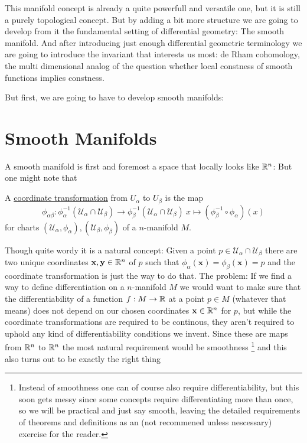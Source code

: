 This manifold concept is already a quite powerfull and versatile one, but it is still a purely topological
concept. But by adding a bit more structure we are going to develop from it the fundamental setting of differential geometry:
The smooth manifold. And after introducing just enough differential geometric terminology we are going
to introduce the invariant that interests us most: de Rham cohomology, the multi dimensional analog of
the question whether local constness of smooth functions implies constness.

But first, we are going to have to develop smooth manifolds:

\section{Smooth Manifolds}
A smooth manifold is first and foremost a space that locally looks like $\mathbb{R}^n$:
But one might note that 
\begin{definition}
A \underline{coordinate transformation} from $U_\alpha$ to $U_\beta$ is the map
\[
	\phi_{\alpha \beta}: 
		\phi^{-1}_\alpha(\mathcal{U}_\alpha \cap \mathcal{U}_\beta)
		\to
		\phi^{-1}_\beta(\mathcal{U}_\alpha \cap \mathcal{U}_\beta) \
		x \mapsto (\phi^{-1}_\beta \circ \phi_\alpha)(x)
\]
for charts $(\mathcal{U}_\alpha, \phi_\alpha), (\mathcal{U}_\beta, \phi_\beta)$
of a $n$-manifold $M$.
\end{definition}
Though quite wordy it is a natural concept: Given a point
$p \in \mathcal{U}_\alpha \cap \mathcal{U}_\beta$ there are two unique
coordinates $\mathbf{x}, \mathbf{y} \in \mathbb{R}^n$ of $p$ such that
$\phi_\alpha(\mathbf{x}) = \phi_\beta(\mathbf{x}) = p$ and the coordinate
transformation is just the way to do that. The problem: If we find a way to
define differentiation on a $n$-manifold $M$ we would want to make sure that the
differentiability of a function $f: M \to \mathbb{R}$ at a point $p \in M$ (whatever
that means) does not depend on our chosen coordinates $\mathbf{x} \in \mathbb{R}^n$ for
$p$, but while the coordinate transformations are required to be continous,
they aren't required to uphold any kind of differentiability conditions we
invent. Since these are maps from $\mathbb{R}^n$ to $\mathbb{R}^n$ the most natural requirement
would be smoothness \footnote{
	Instead of smoothness one can of course also require differentiability,
	but this soon gets messy since some concepts require differentiating more
	than once, so we will be practical and just say smooth, leaving the
	detailed requirements of theorems and definitions as an (not recommened
	unless nescessary) exercise for the reader.
} and this also turns out to be exactly the right thing
